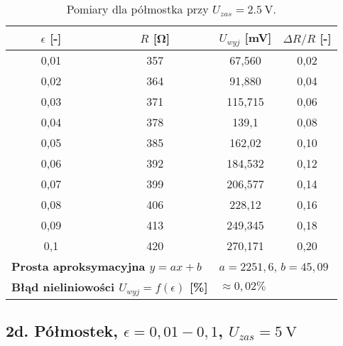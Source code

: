 \documentclass[12pt, a4paper]{article}
\begin{document}
	\begin{table}[H]
		\centering
		\caption{Pomiary dla półmostka przy $U_{zas} = \SI{2.5}{\volt}$.}
		\begin{tabular}{cccc}
			\toprule
			$\epsilon$ [-] & $R$ [\si{\ohm}] & $U_{wyj}$ [\si{\milli\volt}] & $\Delta R/R$ [-] \\
			\midrule
			0,01 & 357 & 67,560 & 0,02 \\
			0,02 & 364 & 91,880 & 0,04 \\
			0,03 & 371 & 115,715 & 0,06 \\
			0,04 & 378 & 139,1 & 0,08 \\
			0,05 & 385 & 162,02 & 0,10 \\
			0,06 & 392 & 184,532 & 0,12 \\
			0,07 & 399 & 206,577 & 0,14 \\
			0,08 & 406 & 228,12 & 0,16 \\
			0,09 & 413 & 249,345 & 0,18 \\
			0,1 & 420 & 270,171 & 0,20 \\
			\midrule
			\multicolumn{2}{l}{\textbf{Prosta aproksymacyjna $y = ax + b$}} & \multicolumn{2}{l}{$a = 2251,6$, $b = 45,09$} \\
			\multicolumn{2}{l}{\textbf{Błąd nieliniowości $U_{wyj} = f(\epsilon)$ [\%]}} & \multicolumn{2}{l}{$\approx 0,02 \%$} \\
			\bottomrule
		\end{tabular}
	\end{table}
	
	\subsection{2d. Półmostek, $\epsilon = 0,01-0,1$, $U_{zas} = \SI{5}{\volt}$}
	
\end{document}
